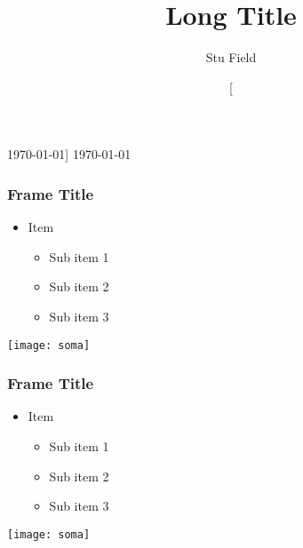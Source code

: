 \documentclass[compress]{beamer}%
\begin{document}
\title[Short Title]{Long Title}


\author[COMPANY-Confidential]{Stu Field}

\date

[\today]
{\today}

\begin{frame}[plain]
    \titlepage
\end{frame}

\begin{comment}
\begin{frame}
	\frametitle{Outline}
	\tableofcontents
\end{frame}
\end{comment}


\begin{frame}
	\frametitle{Frame Title}
	\begin{itemize}
		\item Item
		\begin{itemize}
			\item Sub item 1
			\item Sub item 2
			\item Sub item 3
		\end{itemize}
	\end{itemize}
	\begin{center}
		\texttt{[image: soma]}
	\end{center}
\end{frame}

\begin{frame}
	\frametitle{Frame Title}
	\begin{minipage}{.45\textwidth}
		\begin{itemize}
			\item Item
			\begin{itemize}
				\item Sub item 1
				\item Sub item 2
				\item Sub item 3
			\end{itemize}
		\end{itemize}
	\end{minipage}	
	\begin{minipage}{.45\textwidth}
		\begin{flushright}
			\texttt{[image: soma]}
		\end{flushright}
	\end{minipage}	
\end{frame}
\end{document}
